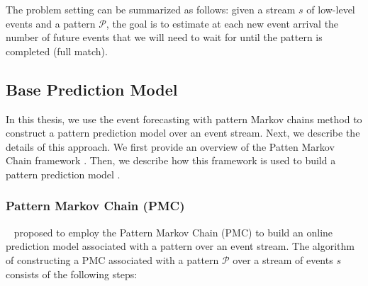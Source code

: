 \par The problem setting can be summarized as follows: given a stream $s$ of low-level events and a pattern $\mathcal{P}$, 
the goal is to estimate at each new event arrival the number of future events
that we will need to wait for until the pattern is completed (full match).

\subsection{Base Prediction Model}
\label{sec:Event-Forecasting-PMC}

\par In this thesis, we use the event forecasting with pattern Markov chains method \cite{alevizos2017event} to construct a pattern prediction model over an event stream. Next, we describe the details of this approach. We first provide an overview of the Patten Markov Chain framework \cite{nuel_pattern_2008}. Then, we describe how this framework is used to build a pattern prediction model \cite{alevizos2017event}.  


\subsubsection*{Pattern Markov Chain (PMC)}

~\citet{alevizos2017event} proposed to employ the Pattern Markov Chain (PMC) \cite{nuel_pattern_2008} to build an online prediction model associated with a pattern over an event stream. The algorithm of constructing a PMC associated with a pattern $\mathcal{P}$ over a stream of events $s$ consists of the following steps:

